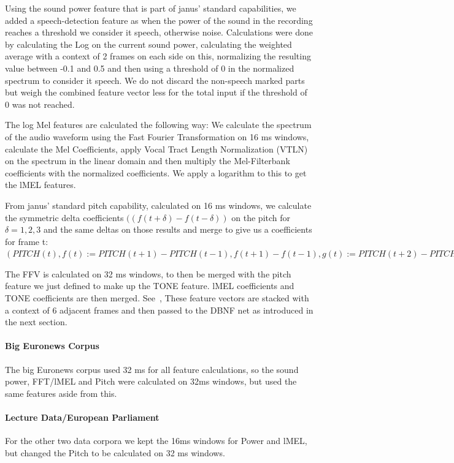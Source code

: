 Using the sound power feature that is part of janus' standard capabilities, we added a speech-detection feature as when the power of the sound in the recording reaches a threshold we consider it speech, otherwise noise. Calculations were done by calculating the Log on the current sound power, calculating the weighted average with a context of 2 frames on each side on this, normalizing the resulting value between -0.1 and 0.5 and then using a threshold of 0 in the normalized spectrum to consider it speech. We do not discard the non-speech marked parts but weigh the combined feature vector less for the total input if the threshold of 0 was not reached.  

The log Mel features are calculated the following way: We calculate the spectrum of the audio waveform using the Fast Fourier Transformation on 16 ms windows, calculate the Mel Coefficients, apply Vocal Tract Length Normalization (VTLN) on the spectrum in the linear domain and then multiply the Mel-Filterbank coefficients with the normalized coefficients. We apply a logarithm to this to get the lMEL features.

From janus' standard pitch capability, calculated on 16 ms windows, we calculate the symmetric delta coefficients \(((f(t+\delta) - f(t-\delta))\) on the pitch for \(\delta=1,2,3\) and the same deltas on those results and merge to give us a coefficients for frame t:
\((PITCH(t), f(t):=PITCH(t+1)-PITCH(t-1),f(t+1)-f(t-1),g(t):=PITCH(t+2)-PITCH(t-2),g(t+2)-g(t-2),h(t):=PITCH(t+3)-PITCH(t-3),h(t+3)-h(t-3))\)

The FFV is calculated on 32 ms windows, to then be merged  with the pitch feature we just defined to make up the TONE feature. lMEL coefficients and TONE coefficients are then merged. See~\cite{laskowski2009modeling},  \cite{laskowski2008fundamental}These feature vectors are stacked with a context of 6 adjacent frames and then passed to the DBNF net as introduced in the next section.
\paragraph{Big Euronews Corpus} The big Euronews corpus used 32 ms for all feature calculations, so the sound power, FFT/lMEL and Pitch were calculated on 32ms windows, but used the same features aside from this.
\paragraph{Lecture Data/European Parliament} For the other two data corpora we kept the 16ms windows for Power and lMEL, but changed the Pitch to be calculated on 32 ms windows.

